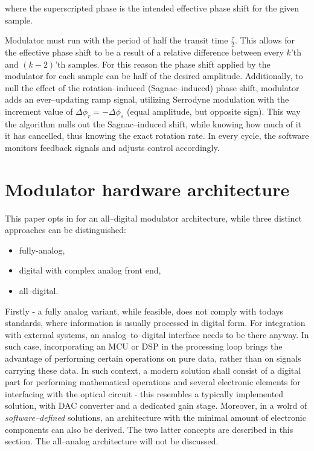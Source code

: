 \documentclass{article}
\begin{document}
\noindent
where the superscripted phase is the intended effective phase shift for the given sample.

Modulator must run with the period of half the transit time $\frac{\tau}{2}$. This allows for the effective phase shift to be a result of a relative difference between every $k$'th and $(k-2)$'th samples. For this reason the phase shift applied by the modulator for each sample can be half of the desired amplitude.
Additionally, to null the effect of the rotation--induced (Sagnac--induced) phase shift, modulator adds an ever--updating ramp signal, utilizing Serrodyne modulation
with the increment value of $\Delta\phi_r = -\Delta\phi_s$ (equal amplitude, but opposite sign). This way the algorithm nulls out the Sagnac--induced shift, while knowing how much of it it has cancelled, thus knowing the exact rotation rate. In every cycle, the software monitors feedback signals and adjusts control accordingly.

\section{Modulator hardware architecture}
This paper opts in for an all--digital modulator architecture, while three distinct approaches can be distinguished:
\begin{itemize}
    \item fully-analog,
    \item digital with complex analog front end,
    \item all--digital.
\end{itemize}

\noindent
Firstly - a fully analog variant, while feasible, does not comply with todays standards, where information is usually processed in digital form. For integration with external systems, an analog--to--digital interface needs to be there anyway. In such case, incorporating an MCU or DSP in the processing loop brings the advantage of performing certain operations on pure data, rather than on signals carrying these data. In such context, a modern solution shall consist of a digital part for performing mathematical operations and several electronic elements for interfacing with the optical circuit - this resembles a typically implemented solution, with DAC converter and a dedicated gain stage. Moreover, in a wolrd of \textit{software--defined}
solutions, an architecture with the minimal amount of electronic components can also be derived. The two latter concepts are described in this section. The all--analog architecture will not be discussed.
\end{document}
